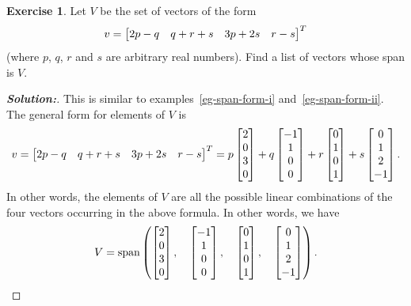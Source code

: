 \documentclass[a4paper]{amsart}
\theoremstyle{definition}
\newtheorem{exercise}{Exercise}
\newenvironment{solution}{\begin{proof}[\textbf{Solution:}] \vphantom{u}}{\end{proof}}
\begin{document}
\begin{exercise}\label{ex-span-form-i}
 Let $V$ be the set of vectors of the form
 \[ v = \left[\begin{matrix} 2p-q  & q+r+s & 3p+2s & r-s \end{matrix}\right]^T \]
 (where $p$, $q$, $r$ and $s$ are arbitrary real numbers).  Find a
 list of vectors whose span is $V$.
\end{exercise}
\begin{solution}
 This is similar to examples~\ref{eg-span-form-i}
 and~\ref{eg-span-form-ii}.  The general form for elements of $V$ is 
 \[ v = \left[\begin{matrix} 2p-q  & q+r+s & 3p+2s & r-s \end{matrix}\right]^T
      = p \left[\begin{matrix}  2\\0\\3\\ 0 \end{matrix}\right] + 
        q \left[\begin{matrix} -1\\1\\0\\ 0 \end{matrix}\right] +
        r \left[\begin{matrix}  0\\1\\0\\ 1 \end{matrix}\right] +
        s \left[\begin{matrix}  0\\1\\2\\-1 \end{matrix}\right].
 \]
 In other words, the elements of $V$ are all the possible linear
 combinations of the four vectors occurring in the above formula.  In
 other words, we have 
 \[ V = \operatorname{span}\left(
        \left[\begin{matrix}  2\\0\\3\\ 0 \end{matrix}\right] ,\quad
        \left[\begin{matrix} -1\\1\\0\\ 0 \end{matrix}\right] ,\quad
        \left[\begin{matrix}  0\\1\\0\\ 1 \end{matrix}\right] ,\quad
        \left[\begin{matrix}  0\\1\\2\\-1 \end{matrix}\right] 
        \right).
 \]
\end{solution}
\end{document}
